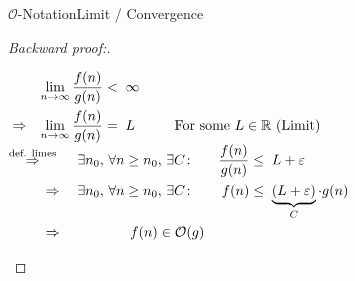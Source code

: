 \begin{frame}{$\mathcal{O}$-Notation}{Limit / Convergence}
  \begin{proof}[Backward proof:]
    \begin{center}
      \vspace{-0.5em}
      \begin{math}
        \begin{aligned}
          & {} & \lim_{n \to \infty} \frac{f(n)}{g(n)} &< \; \infty\\
          & \Rightarrow & \lim_{n \to \infty} \frac{f(n)}{g(n)} &= \; L &&
          \hspace*{1.5em}\text{For some } L \in \mathbb{R} \text{ (Limit)}
        \end{aligned}
      \end{math}
      \vspace{1.0em}\\
      \begin{math}
        \begin{aligned}
          \stackrel{\text{def. limes}}{\Rightarrow} \hspace*{0.5em} &&
          \exists n_0, \, \forall n \geq n_0, \, \exists C\!: \hspace*{1.0em}&&
          \frac{f(n)}{g(n)} &\leq \; L + \varepsilon\\
          \Rightarrow \; &&
          \exists n_0, \, \forall n \geq n_0, \, \exists C\!: \hspace*{1.0em}&&
          f(n) &\leq \; \underbrace{(L + \varepsilon)}_{C} \cdot g(n)\\
          \Rightarrow \; &&
          f(n) \in \mathcal{O}(g)
          \qedhere
        \end{aligned}
      \end{math}
    \end{center}
  \end{proof}
\end{frame}